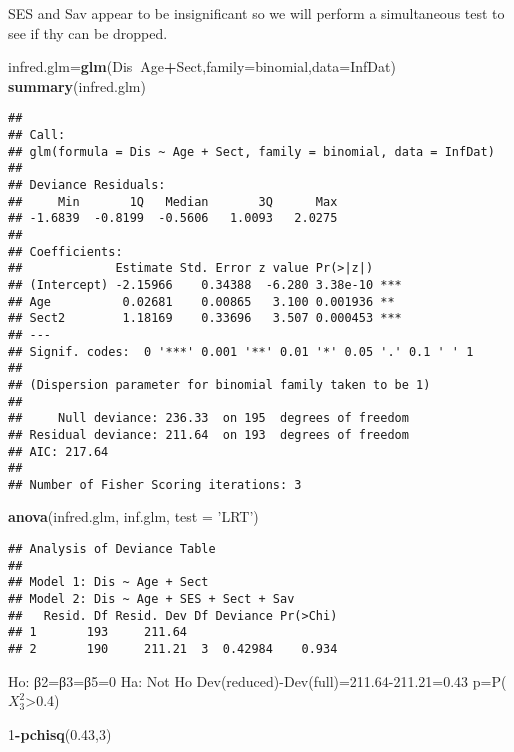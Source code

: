 \documentclass[]{article}
\newenvironment{Shaded}{\begin{snugshade}}{\end{snugshade}}
\newcommand{\KeywordTok}[1]{\textcolor[rgb]{0.13,0.29,0.53}{\textbf{#1}}}
\newcommand{\DataTypeTok}[1]{\textcolor[rgb]{0.13,0.29,0.53}{#1}}
\newcommand{\DecValTok}[1]{\textcolor[rgb]{0.00,0.00,0.81}{#1}}
\newcommand{\FloatTok}[1]{\textcolor[rgb]{0.00,0.00,0.81}{#1}}
\newcommand{\StringTok}[1]{\textcolor[rgb]{0.31,0.60,0.02}{#1}}
\newcommand{\OperatorTok}[1]{\textcolor[rgb]{0.81,0.36,0.00}{\textbf{#1}}}
\newcommand{\NormalTok}[1]{#1}
\begin{document}
SES and Sav appear to be insignificant so we will perform a simultaneous
test to see if thy can be dropped.

\begin{Shaded}
\begin{Highlighting}[]
\NormalTok{infred.glm=}\KeywordTok{glm}\NormalTok{(Dis}\OperatorTok{~}\NormalTok{Age}\OperatorTok{+}\NormalTok{Sect,}\DataTypeTok{family=}\NormalTok{binomial,}\DataTypeTok{data=}\NormalTok{InfDat)}
\KeywordTok{summary}\NormalTok{(infred.glm)}
\end{Highlighting}
\end{Shaded}

\begin{verbatim}
## 
## Call:
## glm(formula = Dis ~ Age + Sect, family = binomial, data = InfDat)
## 
## Deviance Residuals: 
##     Min       1Q   Median       3Q      Max  
## -1.6839  -0.8199  -0.5606   1.0093   2.0275  
## 
## Coefficients:
##             Estimate Std. Error z value Pr(>|z|)    
## (Intercept) -2.15966    0.34388  -6.280 3.38e-10 ***
## Age          0.02681    0.00865   3.100 0.001936 ** 
## Sect2        1.18169    0.33696   3.507 0.000453 ***
## ---
## Signif. codes:  0 '***' 0.001 '**' 0.01 '*' 0.05 '.' 0.1 ' ' 1
## 
## (Dispersion parameter for binomial family taken to be 1)
## 
##     Null deviance: 236.33  on 195  degrees of freedom
## Residual deviance: 211.64  on 193  degrees of freedom
## AIC: 217.64
## 
## Number of Fisher Scoring iterations: 3
\end{verbatim}

\begin{Shaded}
\begin{Highlighting}[]
\KeywordTok{anova}\NormalTok{(infred.glm, inf.glm, }\DataTypeTok{test =} \StringTok{'LRT'}\NormalTok{)}
\end{Highlighting}
\end{Shaded}

\begin{verbatim}
## Analysis of Deviance Table
## 
## Model 1: Dis ~ Age + Sect
## Model 2: Dis ~ Age + SES + Sect + Sav
##   Resid. Df Resid. Dev Df Deviance Pr(>Chi)
## 1       193     211.64                     
## 2       190     211.21  3  0.42984    0.934
\end{verbatim}

Ho: β2=β3=β5=0 Ha: Not Ho Dev(reduced)-Dev(full)=211.64-211.21=0.43
p=P(\(X^2_3\)\textgreater{}0.4)

\begin{Shaded}
\begin{Highlighting}[]
\DecValTok{1}\OperatorTok{-}\KeywordTok{pchisq}\NormalTok{(}\FloatTok{0.43}\NormalTok{,}\DecValTok{3}\NormalTok{)}
\end{Highlighting}
\end{Shaded}
\end{document}
